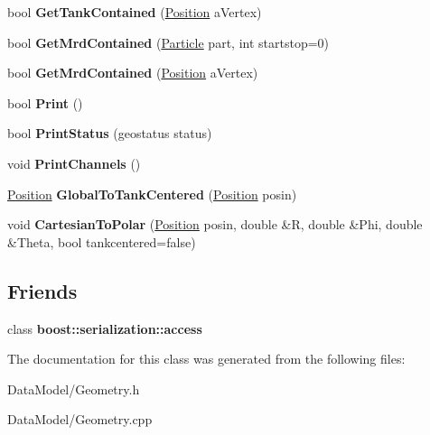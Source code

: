 \begin{DoxyCompactItemize}
\item 
\hypertarget{classGeometry_a2c68539bcaaf45158dbcdc50c3f65ca6}{
bool {\bfseries GetTankContained} (\hyperlink{classPosition}{Position} aVertex)}
\label{classGeometry_a2c68539bcaaf45158dbcdc50c3f65ca6}

\item 
\hypertarget{classGeometry_af4c8b8f5df92cf905e0ea7098ceb52ed}{
bool {\bfseries GetMrdContained} (\hyperlink{classParticle}{Particle} part, int startstop=0)}
\label{classGeometry_af4c8b8f5df92cf905e0ea7098ceb52ed}

\item 
\hypertarget{classGeometry_a9da73da227027f3592e9ef10cb06033f}{
bool {\bfseries GetMrdContained} (\hyperlink{classPosition}{Position} aVertex)}
\label{classGeometry_a9da73da227027f3592e9ef10cb06033f}

\item 
\hypertarget{classGeometry_a5ddd7d7d95f76d8d711c9727824020ca}{
bool {\bfseries Print} ()}
\label{classGeometry_a5ddd7d7d95f76d8d711c9727824020ca}

\item 
\hypertarget{classGeometry_acf8cf2161abe0c73a4f285f66277f2cd}{
bool {\bfseries PrintStatus} (geostatus status)}
\label{classGeometry_acf8cf2161abe0c73a4f285f66277f2cd}

\item 
\hypertarget{classGeometry_a12b34f2e75cdee8441008d9de7e2eb1b}{
void {\bfseries PrintChannels} ()}
\label{classGeometry_a12b34f2e75cdee8441008d9de7e2eb1b}

\item 
\hypertarget{classGeometry_af1ef26f91bb256a2a7d52c37f502acc7}{
\hyperlink{classPosition}{Position} {\bfseries GlobalToTankCentered} (\hyperlink{classPosition}{Position} posin)}
\label{classGeometry_af1ef26f91bb256a2a7d52c37f502acc7}

\item 
\hypertarget{classGeometry_a89335cdbf640744d7e4362d8495b6859}{
void {\bfseries CartesianToPolar} (\hyperlink{classPosition}{Position} posin, double \&R, double \&Phi, double \&Theta, bool tankcentered=false)}
\label{classGeometry_a89335cdbf640744d7e4362d8495b6859}

\end{DoxyCompactItemize}
\subsection*{Friends}
\begin{DoxyCompactItemize}
\item 
\hypertarget{classGeometry_ac98d07dd8f7b70e16ccb9a01abf56b9c}{
class {\bfseries boost::serialization::access}}
\label{classGeometry_ac98d07dd8f7b70e16ccb9a01abf56b9c}

\end{DoxyCompactItemize}


The documentation for this class was generated from the following files:\begin{DoxyCompactItemize}
\item 
DataModel/Geometry.h\item 
DataModel/Geometry.cpp\end{DoxyCompactItemize}
